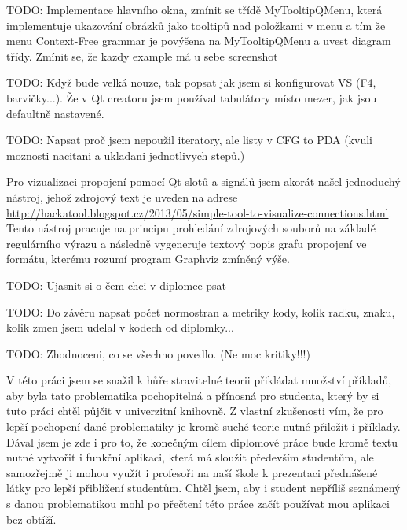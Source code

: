 TODO: Implementace hlavního okna, zmínit se třídě MyTooltipQMenu, která implementuje ukazování obrázků jako tooltipů nad položkami v menu a tím že menu Context-Free grammar je povýšena na MyTooltipQMenu a uvest diagram třídy. Zmínit se, že kazdy example má u sebe screenshot

TODO: Když bude velká nouze, tak popsat jak jsem si konfigurovat VS (F4, barvičky...). Že v Qt creatoru jsem používal tabulátory místo mezer, jak jsou defaultně nastavené.


TODO: Napsat proč jsem nepoužil iteratory, ale listy v CFG to PDA (kvuli moznosti nacitani a ukladani jednotlivych stepů.)


Pro vizualizaci propojení pomocí Qt slotů a signálů jsem akorát našel jednoduchý nástroj, jehož zdrojový text je uveden na adrese \url{http://hackatool.blogspot.cz/2013/05/simple-tool-to-visualize-connections.html}. Tento nástroj pracuje na principu prohledání zdrojových souborů na základě regulárního výrazu a následně vygeneruje textový popis grafu propojení ve formátu, kterému rozumí program Graphviz zmíněný výše. 



TODO: Ujasnit si o čem chci v diplomce psat

TODO: Do závěru napsat počet normostran a metriky kody, kolik radku, znaku, kolik zmen jsem udelal v kodech od diplomky...

TODO: Zhodnoceni, co se všechno povedlo. (Ne moc kritiky!!!)

V této práci jsem se snažil k hůře stravitelné teorii přikládat množství příkladů, aby byla tato problematika pochopitelná a přínosná pro studenta, který by si tuto práci chtěl půjčit v univerzitní knihovně. Z vlastní zkušenosti vím, že pro lepší pochopení dané problematiky je kromě suché teorie nutné přiložit i příklady. Dával jsem je zde i pro to, že konečným cílem diplomové práce bude kromě textu nutné vytvořit i funkční aplikaci, která má sloužit především studentům, ale samozřejmě ji mohou využít i profesoři na naší škole k prezentaci přednášené látky pro lepší přiblížení studentům. Chtěl jsem, aby i student nepříliš seznámený s danou problematikou mohl po přečtení této práce začít používat mou aplikaci bez obtíží.


